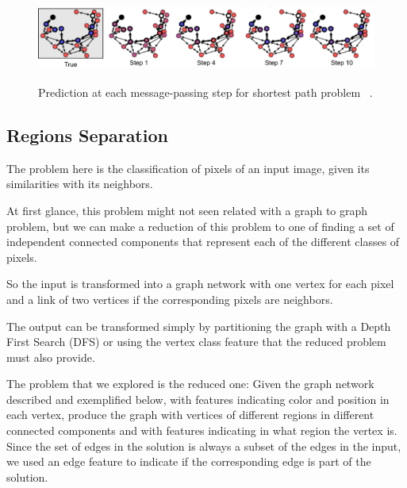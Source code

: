 \begin{figure}[!htb]
    \centering
    \includegraphics[height=3.0cm]{fig/content/analysed_problems/shortest_paths/steps.png}
    \caption{Prediction at each message-passing step for shortest path problem ~\cite{Battaglia_2018}.}
\end{figure}


\subsection{Regions Separation}

The problem here is the classification of pixels of an input image, given its similarities with its neighbors. 

At first glance, this problem might not seen related with a graph to graph problem, but we can make a reduction of this problem to one of finding a set of independent connected components that represent each of the different classes of pixels. 

So the input is transformed into a graph network with one vertex for each pixel and a link of two vertices if the corresponding pixels are neighbors.

The output can be transformed simply by partitioning the graph with a Depth First Search (DFS) or using the vertex class feature that the reduced problem must also provide.

The problem that we explored is the reduced one: Given the graph network described and exemplified below, with features indicating color and position in each vertex, produce the graph with vertices of different regions in different connected components and with features indicating in what region the vertex is. Since the set of edges in the solution is always a subset of the edges in the input, we used an edge feature to indicate if the corresponding edge is part of the solution.

